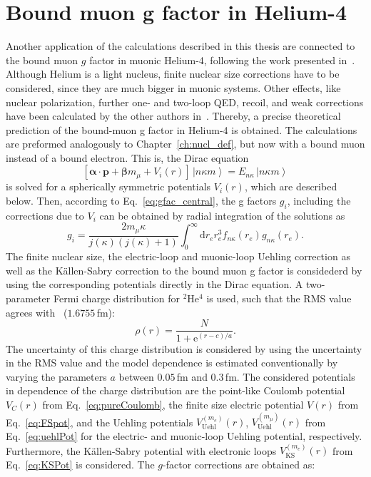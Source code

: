 \section{Bound muon g factor in Helium-4}
\label{sec:muon_he}
Another application of the calculations described in this thesis are connected to the bound muon $g$ factor in muonic Helium-4, following the work presented in~\cite{sikora2018}. Although Helium is a light nucleus, finite nuclear size corrections have to be considered, since they are much bigger in muonic systems. Other effects, like nuclear polarization, further one- and two-loop QED, recoil, and weak corrections have been calculated by the other authors in~\cite{sikora2018}. Thereby, a precise theoretical prediction of the bound-muon g factor in Helium-4 is obtained.
The calculations are preformed analogously to Chapter~\ref{ch:nucl_def}, but now with a bound muon instead of a bound electron. This is, the Dirac equation
\begin{equation}
\label{eq:boundMuonDirac}
\left[\boldsymbol{\alpha}\cdot\mathbf{p}+
\boldsymbol{\beta}m_\mu + V_i(r)\right]
\,\left|n\kappa m\right> = E_{n\kappa} \, \left|n\kappa m\right>
\end{equation}
is solved for a spherically symmetric potentials $V_i(r)$, which are described below. Then, according to Eq.~\eqref{eq:gfac_central}, the g factors $g_i$, including the corrections due to $V_i$ can be obtained by radial integration of the solutions as
\begin{equation}
g_i=\frac{2m_\mu\kappa}{j(\kappa)(j(\kappa)+1)}\int_0^\infty\mathrm{d}r_e r_e^3 f_{n\kappa}(r_e)g_{n\kappa}(r_e).
\label{eq:gfac_centralMuon}
\end{equation}
The finite nuclear size, the electric-loop and muonic-loop Uehling correction as well as the Källen-Sabry correction to the bound muon g factor is considederd by using the corresponding potentials directly in the Dirac equation. A two-parameter Fermi charge distribution for $^2$He$^4$ is used, such that the RMS value agrees with~\cite{Angeli2013} ($1.6755\,$fm):
\begin{equation}
\rho(r) = \frac{N}{1+\text{e}^{(r-c)/a}}.
\end{equation}
The uncertainty of this charge distribution is considered by using the uncertainty in the RMS value and the model dependence is estimated conventionally by varying the parameters $a$ between $0.05\,$fm and $0.3\,$fm. The considered potentials in dependence of the charge distribution are the point-like Coulomb potential $V_C(r)$ from Eq.~\eqref{eq:pureCoulomb}, the finite size electric potential $V(r)$ from Eq.~\eqref{eq:FSpot}, and the Uehling potentials $V^{(m_e)}_{\text{Uehl}}(r)$, $V^{(m_\mu)}_{\text{Uehl}}(r)$ from Eq.~\eqref{eq:uehlPot} for the electric- and muonic-loop Uehling potential, respectively. Furthermore, the Källen-Sabry potential with electronic loops $V^{(m_e)}_{\text{KS}}(r)$ from Eq.~\eqref{eq:KSPot} is considered. The $g$-factor corrections are obtained as:\\[8pt]
